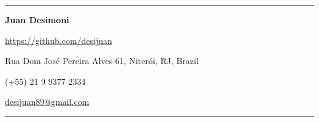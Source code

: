 \documentclass[12pt, a4paper]{article}
\makeatletter
\newcommand{\email}{desijuan89@gmail.com}
\newcommand{\github}{https://github.com/desijuan}
\makeatother
\begin{document}
\pagestyle{empty}
\thispagestyle{empty}

\rule{\textwidth}{1.5pt}\par
\begin{minipage}[c]{.37\textwidth}
  \vspace{7pt}
  {\Huge\color{teal}\bfseries Juan Desimoni}\par
  \vspace{4pt}
  \url{\github}
  \vspace{6pt}
\end{minipage}
\hfill
\begin{minipage}[c]{.5\textwidth}
  \raggedleft
  Rua Dom José Pereira Alves 61, Niterói, RJ, Brazil\par
  (+55) 21 9 9377 2334\par
  \href{mailto:\email}{\email}
\end{minipage}
\rule{\textwidth}{1.5pt}\par
\vspace{1pt}
\end{document}

